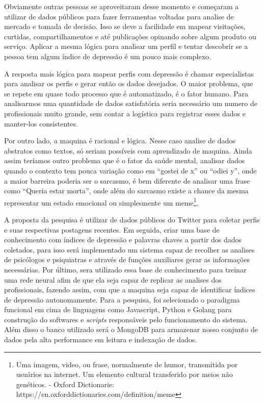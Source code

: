 \documentclass[
	12pt,				%
	openright,			%
	twoside,			%
	a4paper,			%
	english,			%
	french,				%
	spanish,			%
	brazil				%
	]{abntex2}
\begin{document}
Obviamente outras pessoas se aproveitaram desse momento e começaram a utilizar de dados públicos para fazer ferramentas voltadas para analise de mercado e tomada de decisão. Isso se deve a facilidade em mapear visitações, curtidas, compartilhamentos e até publicações opinando sobre algum produto ou serviço. Aplicar a mesma lógica para analisar um perfil e tentar descobrir se a pessoa tem algum índice de depressão é um pouco mais complexo.

A resposta mais lógica para mapear perfis com depressão é chamar especialistas para analisar os perfis e gerar então os dados desejados. O maior problema, que se repete em quase todo processo que é automatizado, é o fator humano. Para analisarmos uma quantidade de dados satisfatória seria necessário um numero de profissionais muito grande, sem contar a logística para registrar esses dados e manter-los consistentes. 

Por outro lado, a maquina é racional e lógica. Nesse caso analise de dados abstratos como textos, só seriam possíveis com aprendizado de maquina. Ainda assim teríamos outro problema que é o fator da saúde mental, analisar dados quando o contexto tem pouca variação como em “gostei de x” ou “odiei y”, onde a maior barreira poderia ser o sarcasmo, é bem diferente de analisar uma frase como “Queria estar morta”, onde além do sarcasmo existe a chance da mesma representar um estado emocional ou simplesmente um meme\footnote{Uma imagem, video, ou frase, normalmente de humor, transmitida por usuários na internet. Um elemento cultural transferido por meios não genéticos. - Oxford Dictionarie: https://en.oxforddictionaries.com/definition/meme}.

A proposta da pesquisa é utilizar de dados públicos do Twitter para coletar perfis e suas respectivas postagens recentes. Em seguida, criar uma base de conhecimento com índices de depressão e palavras chaves a partir dos dados coletados, para isso será implementado um sistema capaz de recolher as analises de psicólogos e psiquiatras e através de funções auxiliares gerar as informações necessárias. Por último, sera utilizado essa base de conhecimento para treinar uma rede neural afim de que ela seja capaz de replicar as analises dos profissionais, fazendo assim, com que a maquina seja capaz de identificar índices de depressão autonomamente. Para a pesquisa, foi selecionado o paradigma funcional em cima de linguagens como Javascript, Python e Golang para construção do softwares e \textit{scripts} responsáveis pelo funcionamento do sistema. Além disso o banco utilizado será o MongoDB para armazenar nosso conjunto de dados pela alta performance em leitura e indexação de dados.
\end{document}
